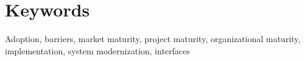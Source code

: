 \section*{\hfil  \hspace{4cm} Keywords \hfil}

Adoption, barriers, market maturity, project maturity, organizational maturity, implementation, system modernization, interfaces
